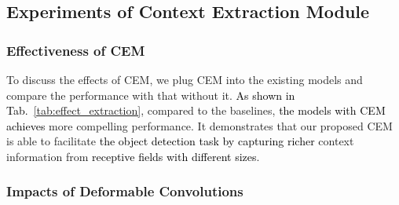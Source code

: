 \documentclass[journal]{IEEEtran}
\def\qcr{\fontfamily{qcr}\selectfont}
\def\myblue{\textcolor{black}}
\begin{document}
	
	\subsection{Experiments of Context Extraction Module}\label{sec:cem}
	
	\subsubsection{Effectiveness of CEM}
	
	To discuss the effects of CEM, we plug CEM into the existing models and compare the performance with that without it. \myblue{As shown in Tab.~\ref{tab:effect_extraction}}, compared to the baselines, \myblue{the models with CEM achieves} more compelling performance. It demonstrates that our proposed CEM is able to facilitate \myblue{the object detection task by capturing richer} context information from \myblue{receptive fields with different sizes}.
	


	
	\begin{table}[t]
		\centering
		\caption{Effects of our CEM with ResNet-50 on COCO {\qcr{minival}}.}
\label{tab:effect_extraction}\end{table}

	


	\subsubsection{Impacts of Deformable Convolutions}
	
\end{document}
